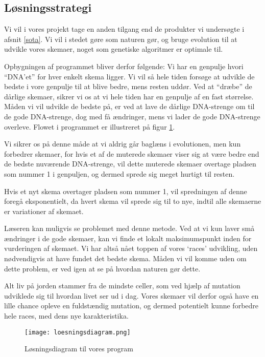 \subsection{Løsningsstrategi}
Vi vil i vores projekt tage en anden tilgang end de produkter vi undersøgte i afsnit \ref{sota}. Vi vil i stedet gøre som naturen gør, og bruge evolution til at udvikle vores skemaer, noget som genetiske algoritmer er optimale til.

Opbygningen af programmet bliver derfor følgende: Vi har en genpulje hvori ``DNA'et'' for hver enkelt skema ligger. Vi vil så hele tiden forsøge at udvikle de bedste i vore genpulje til at blive bedre, mens resten uddør. Ved at ``dræbe'' de dårlige skemaer, sikrer vi os at vi hele tiden har en genpulje af en fast størrelse. Måden vi vil udvikle de bedste på, er ved at lave de dårlige DNA-strenge om til de gode DNA-strenge, dog med få ændringer, mens vi lader de gode DNA-strenge overleve. Flowet i programmet er illustreret på figur \ref{fig:loesningsdiagram}.

Vi sikrer os på denne måde at vi aldrig går baglæns i evolutionen, men kun forbedrer skemaer, for hvis et af de muterede skemaer viser sig at være bedre end de bedste nuværende DNA-strenge, vil dette muterede skemaer overtage pladsen som nummer 1 i genpuljen, og dermed sprede sig meget hurtigt til resten.

Hvis et nyt skema overtager pladsen som nummer 1, vil spredningen af denne foregå eksponentielt, da hvert skema vil sprede sig til to nye, indtil alle skemaerne er variationer af skemaet.

Læseren kan muligvis se problemet med denne metode. Ved at vi kun laver små ændringer i de gode skemaer, kan vi finde et lokalt maksimumspunkt inden for vurderingen af skemaet. Vi har altså nået toppen af vores `races' udvikling, uden nødvendigvis at have fundet det bedste skema. Måden vi vil komme uden om dette problem, er ved igen at se på hvordan naturen gør dette.

Alt liv på jorden stammer fra de mindste celler, som ved hjælp af mutation udviklede sig til hvordan livet ser ud i dag. Vores skemaer vil derfor også have en lille chance opleve en fuldstændig mutation, og dermed potentielt kunne forbedre hele races, med dens nye karakteristika.

\begin{figure}[h!]
	\centering
	\texttt{[image: loesningsdiagram.png]}
	\caption{Løsningsdiagram til vores program}
	\label{fig:loesningsdiagram}
\end{figure}